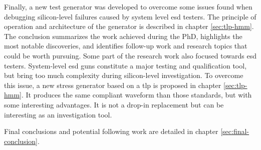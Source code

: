 %
Finally, a new test generator was developed to overcome some issues found when debugging silicon-level failures caused by system level \gls{esd} testers.
The principle of operation and architecture of the generator is described in chapter \ref{sec:tlp-hmm}.
The conclusion summarizes the work achieved during the PhD, highlights the most notable discoveries, and identifies follow-up work and research topics that could be worth pursuing.
Some part of the research work also focused towards \gls{esd} testers.
System-level \gls{esd} guns \cite{iec61000-4-2, iso10605} constitute a major testing and qualification tool, but bring too much complexity during silicon-level investigation.
To overcome this issue, a new stress generator based on a \gls{tlp} is proposed in chapter \ref{sec:tlp-hmm}.
It produces the same compliant waveform than those standards, but with some interesting advantages.
It is not a drop-in replacement but can be interesting as an investigation tool.

%
Final conclusions and potential following work are detailed in chapter \ref{sec:final-conclusion}.

